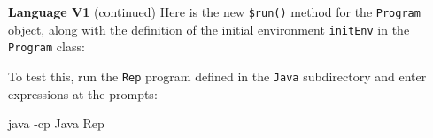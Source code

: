 \begin{minipage}[t]{\sw}
\slidenumber
\LARGE
{\bf Language V1} (continued)\exx
Here is the new \verb'$run()' method for the \verb'Program' object,
along with the definition
of the initial environment \verb'initEnv' in the \verb'Program' class:
{\Large
{}
}
To test this, run the \verb'Rep' program
defined in the \verb'Java' subdirectory
and enter expressions at the prompts:
\begin{qv}
java -cp Java Rep
\end{qv}
\end{minipage}
\clearpage
